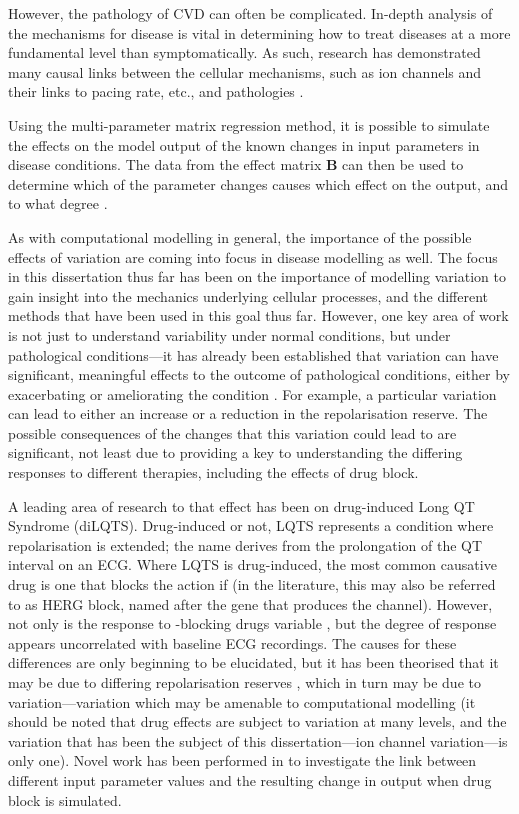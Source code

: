 \documentclass[../thesis-main.tex]{subfiles}
\begin{document}
 However, the pathology of CVD can often be complicated. In-depth analysis of the mechanisms for disease is vital in determining how to treat diseases at a more fundamental level than symptomatically. As such, research has demonstrated many causal links between the cellular mechanisms, such as ion channels and their links to pacing rate, etc., and pathologies \citep{Inoue2006a, Kurz1993, Rodriguez2006, Dumaine1996, Nattel2010, Jurkat-Rott2005, Biagetti2006}.
 
 Using the multi-parameter matrix regression method, it is possible to simulate the effects on the model output of the known changes in input parameters in disease conditions. The data from the effect matrix $\mathbf{B}$ can then be used to determine which of the parameter changes causes which effect on the output, and to what degree \citep{Sarkar2012}.
 
 As with computational modelling in general, the importance of the possible effects of variation are coming into focus in disease modelling as well. The focus in this dissertation thus far has been on the importance of modelling variation to gain insight into the mechanics underlying cellular processes, and the different methods that have been used in this goal thus far. However, one key area of work is not just to understand variability under normal conditions, but under pathological conditions---it has already been established that variation can have significant, meaningful effects to the outcome of pathological conditions, either by exacerbating or ameliorating the condition \citep{Sarkar2012, John2012}. For example, a particular variation can lead to either an increase or a reduction in the repolarisation reserve. The possible consequences of the changes that this variation could lead to are significant, not least due to providing a key to understanding the differing responses to different therapies, including the effects of drug block.
 
 A leading area of research to that effect has been on drug-induced Long QT Syndrome (diLQTS). Drug-induced or not, LQTS represents a condition where repolarisation is extended; the name derives from the prolongation of the QT interval on an ECG. Where LQTS is drug-induced, the most common causative drug is one that blocks the action if \ikr{} (in the literature, this may also be referred to as HERG block, named after the gene that produces the channel). However, not only is the response to \ikr{}-blocking drugs variable \citep{Kannankeril2010}, but the degree of response appears uncorrelated with baseline ECG recordings. The causes for these differences are only beginning to be elucidated, but it has been theorised that it may be due to differing repolarisation reserves \citep{Varro2011}, which in turn may be due to variation---variation which may be amenable to computational modelling (it should be noted that drug effects are subject to variation at many levels, and the variation that has been the subject of this dissertation---ion channel variation---is only one). Novel work has been performed in \citet{Sarkar2011} to investigate the link between different input parameter values and the resulting change in output when drug block is simulated.
 
\end{document}
